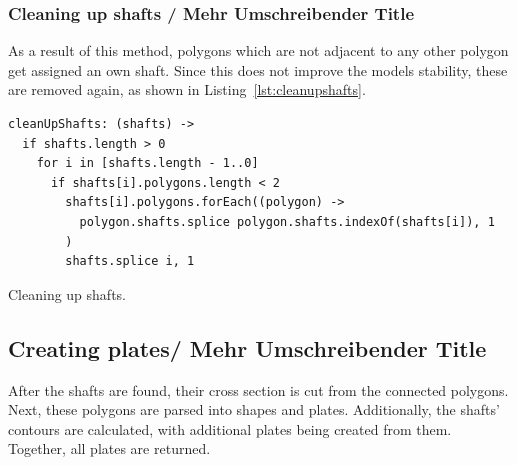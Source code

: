 \documentclass[../ClassicThesis.tex]{subfiles}
\begin{document}
\subsubsection{Cleaning up shafts / Mehr Umschreibender Title}

As a result of this method, polygons which are not adjacent to any other polygon get assigned an own shaft. Since this does not improve the models stability, these are removed again, as shown in Listing~\ref{lst:cleanupshafts}.

\begin{listing}
\begin{verbatim}
cleanUpShafts: (shafts) ->
  if shafts.length > 0
    for i in [shafts.length - 1..0]
      if shafts[i].polygons.length < 2
        shafts[i].polygons.forEach((polygon) ->
          polygon.shafts.splice polygon.shafts.indexOf(shafts[i]), 1
        )
        shafts.splice i, 1
\end{verbatim}
\caption{Cleaning up shafts.}
\label{lst:cleanupshafts}
\end{listing}

\subsection{Creating plates/ Mehr Umschreibender Title}

After the shafts are found, their cross section is cut from the connected polygons. Next, these polygons are parsed into shapes and plates. Additionally, the shafts' contours are calculated, with additional plates being created from them. Together, all plates are returned.
\end{document}

